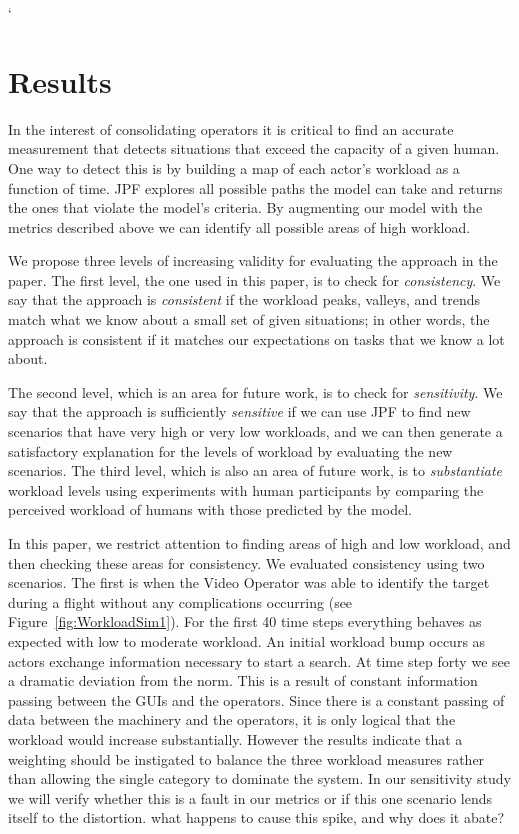 `\section{Results}
In the interest of consolidating operators it is critical to find an accurate measurement that detects situations that exceed the capacity of a given human. One way to detect this is by building a map of each actor's workload as a function of time. JPF explores all possible paths the model can take and returns the ones that violate the model's criteria. By augmenting our model with the metrics described above we can identify all possible areas of high workload. 

We propose three levels of increasing validity for evaluating the approach in the paper.  The first level, the one used in this paper, is to check for {\em consistency}.  We say that the approach is {\em consistent} if the workload peaks, valleys, and trends match what we know about a small set of given situations; in other words, the approach is consistent if it matches our expectations on tasks that we know a lot about.  

The second level, which is an area for future work, is to check for {\em sensitivity}.  We say that  the approach is sufficiently {\em sensitive} if we can use JPF to find new scenarios that have very high or very low workloads, and we can then generate a satisfactory explanation for the levels of workload by evaluating the new scenarios.  The third level, which is also an area of future work, is to {\em substantiate} workload levels using experiments with human participants by comparing the perceived workload of humans with those predicted by the model.

In this paper, we restrict attention to finding areas of high and low workload, and then checking these areas for consistency.  We evaluated consistency using two scenarios.  The first is when the Video Operator was able to identify the target during a flight without any complications occurring (see Figure~\ref{fig:WorkloadSim1}). For the first 40 time steps everything behaves as expected with low to moderate workload. An initial workload bump occurs as actors exchange information necessary to start a search.   At time step forty we see a dramatic deviation from the norm. This is a result of constant information passing between the GUIs and the operators. Since there is a constant passing of data between the machinery and the operators, it is only logical that the workload would increase substantially. However the results indicate that a weighting should be instigated to balance the three workload measures rather than allowing the single category to dominate the system. In our sensitivity study we will verify whether this is a fault in our metrics or if this one scenario lends itself to the distortion.  {\sc what happens to cause this spike, and why does it abate?}

